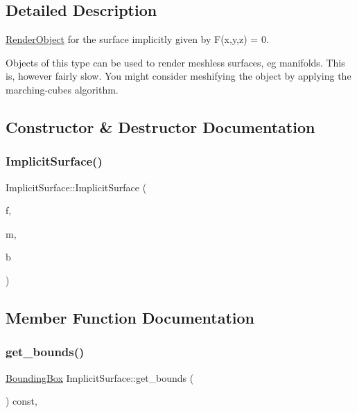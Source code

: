 \subsection{Detailed Description}
\mbox{\hyperlink{classRenderObject}{Render\+Object}} for the surface implicitly given by F(x,y,z) = 0. 

Objects of this type can be used to render meshless surfaces, eg manifolds. This is, however fairly slow. You might consider meshifying the object by applying the marching-\/cubes algorithm. 

\subsection{Constructor \& Destructor Documentation}
\mbox{\label{classImplicitSurface_ab0cfa235e8f935a416c395cfecd2f32b}} 
\subsubsection{\texorpdfstring{ImplicitSurface()}{ImplicitSurface()}}
{\footnotesize\ttfamily Implicit\+Surface\+::\+Implicit\+Surface (\begin{DoxyParamCaption}\item[{\mbox{\hyperlink{classsymcpp_1_1SymbolicGraph}{symcpp\+::\+Symbolic\+Graph}}}]{f,  }\item[{\mbox{\hyperlink{classMaterial}{Material}}}]{m,  }\item[{\mbox{\hyperlink{classBoundingBox}{Bounding\+Box}}}]{b }\end{DoxyParamCaption})}



\subsection{Member Function Documentation}
\mbox{\label{classImplicitSurface_a30f0b97eb9976f8e40be7b990d6352d6}} 
\subsubsection{\texorpdfstring{get\_bounds()}{get\_bounds()}}
{\footnotesize\ttfamily \mbox{\hyperlink{classBoundingBox}{Bounding\+Box}} Implicit\+Surface\+::get\+\_\+bounds (\begin{DoxyParamCaption}{ }\end{DoxyParamCaption}) const\hspace{0.3cm}{\ttfamily [override]}, {\ttfamily [virtual]}}



